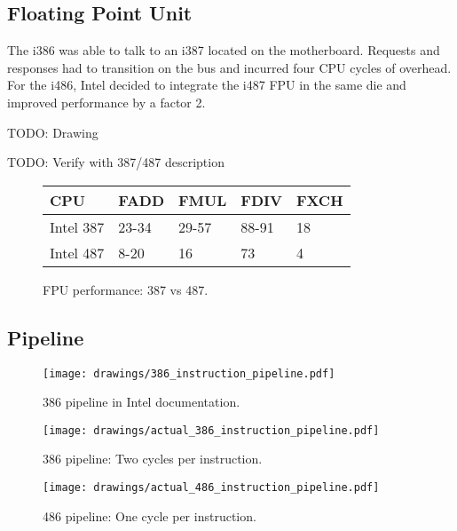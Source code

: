 \subsection{Floating Point Unit}
The i386 was able to talk to an i387 located on the motherboard. Requests and responses had to transition on the bus and incurred four CPU cycles of overhead. For the i486, Intel decided to integrate the i487 FPU in the same die and improved performance by a factor 2.\\
\par
TODO: Drawing
\par

TODO: Verify with 387/487 description




\par
\begin{figure}[H]
\centering
\begin{tabularx}{\textwidth}{ X  X X  X  X}
  \toprule
  \textbf{CPU} & \textbf{FADD} & \textbf{FMUL} & \textbf{FDIV} &\textbf{FXCH} \\ \bottomrule
Intel 387 & 23-34 & 29-57   & 88-91 & 18 \\
Intel 487 & 8-20  & 16   & 73 & 4 \\ \bottomrule
\end{tabularx}
\caption{FPU performance: 387 vs 487.}
\label{perf_summary}
\end{figure}

\subsection{Pipeline}



\begin{figure}[H]
\centering
\texttt{[image: drawings/386\_instruction\_pipeline.pdf]}
\caption{386 pipeline in Intel documentation.}
\end{figure}
\par


\begin{figure}[H]
\centering
\texttt{[image: drawings/actual\_386\_instruction\_pipeline.pdf]}
\caption{386 pipeline: Two cycles per instruction.}
\end{figure}
\par

\begin{figure}[H]
\centering
\texttt{[image: drawings/actual\_486\_instruction\_pipeline.pdf]}
\caption{486 pipeline: One cycle per instruction.}
\end{figure}
\par

